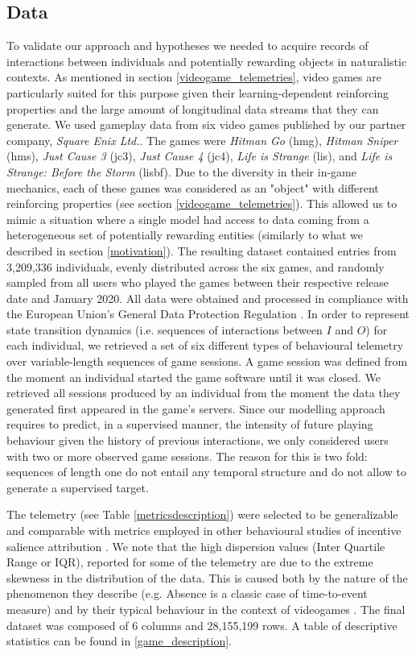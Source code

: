 \subsection{Data}
To validate our approach and hypotheses we needed to acquire records of interactions between individuals and potentially rewarding objects in naturalistic contexts. As mentioned in section \ref{videogame_telemetries}, video games are particularly suited for this purpose given their learning-dependent reinforcing properties and the large amount of longitudinal data streams that they can generate. We used gameplay data from  six video games published by our partner company, \textit{Square Enix Ltd.}. The games were \emph{Hitman Go} (hmg), \emph{Hitman Sniper} (hms), \emph{Just Cause 3} (jc3), \emph{Just Cause 4} (jc4), \emph{Life is Strange} (lis), and \emph{Life is Strange: Before the Storm} (lisbf). Due to the diversity in their in-game mechanics, each of these games was considered as an "object" with different reinforcing properties (see section \ref{videogame_telemetries}). This allowed us to mimic a situation where a single model had access to data coming from a heterogeneous set of potentially rewarding entities (similarly to what we described in section \ref{motivation}). The resulting dataset contained entries from 3,209,336 individuals, evenly distributed across the six games, and randomly sampled from all users who played the games between their respective release date and January 2020. All data were obtained and processed in compliance with the European Union's General Data Protection Regulation \cite{EUdataregulations2018}. In order to represent state transition dynamics (i.e. sequences of interactions between $I$ and $O$) for each individual, we retrieved a set of six different types of behavioural telemetry over variable-length sequences of game sessions. A game session was defined from the moment an individual started the game software until it was closed. We retrieved all sessions produced by an individual from the moment the data they generated first appeared in the game's servers. Since our modelling approach requires to predict, in a supervised manner, the intensity of future playing behaviour given the history of previous interactions, we only considered users with two or more observed game sessions. The reason for this is two fold: sequences of length one do not entail any temporal structure and do not allow to generate a supervised target.

The telemetry (see Table \ref{metricsdescription}) were selected to be generalizable and comparable with metrics employed in other behavioural studies of incentive salience attribution \cite{berridge1998role,mcclure2003computational,zhang2009neural}. We note that the high dispersion values (Inter Quartile Range  or IQR), reported for some of the telemetry are due to the extreme skewness in the distribution of the data. This is caused both by the nature of the phenomenon they describe (e.g. Absence is a classic case of time-to-event measure) and by their typical behaviour in the context of videogames \cite{bauckhage2012players}. The final dataset was composed of 6 columns and 28,155,199 rows. A table of descriptive statistics can be found in \ref{game_description}.

